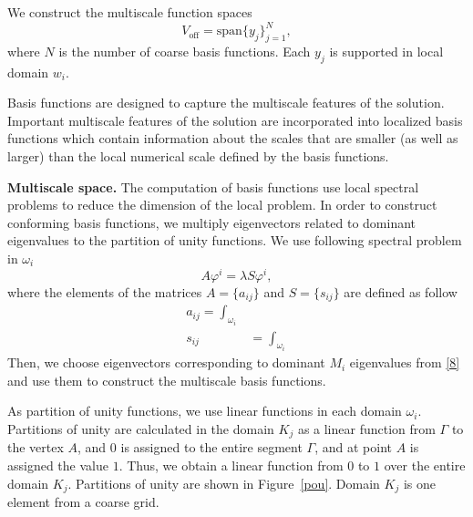 \documentclass[preprint]{elsarticle}
\begin{document}
We construct the multiscale function spaces
\[
	{V}_{\text{off}} = \mbox{span} \{y_{j}\}_{j=1}^{N},
\]
where $N$ is the number of coarse basis functions.
Each $y_j$ is supported in local domain $w_i$.

Basis functions are designed to capture the multiscale features of the solution. 
Important multiscale features of the solution are incorporated into localized basis functions which contain information about the scales that are smaller (as well as larger) than the local numerical scale defined by the basis functions. 
 
\textbf{Multiscale space.}
The computation of basis functions use local spectral problems to reduce the dimension of the local problem. 
In order to construct conforming basis functions, we multiply eigenvectors related to dominant eigenvalues to the partition of unity functions.
We use following spectral problem in $\omega_i$
\begin{equation}\label{8}
	A \varphi^i = \lambda S \varphi^i,
\end{equation} 
where the elements of the matrices $A = \{a_{ij}\}$ and $S = \{s_{ij}\}$ are defined as follow{
\begin{equation}\label{9}
\begin{split}
	a_{ij} = 
	\int_{\omega_i} \\
	s_{ij} & = \int_{\omega _i}
\end{split}
\end{equation}}
Then, we choose eigenvectors corresponding to dominant $M_{i}$ eigenvalues from \eqref{8} and use them to construct the multiscale basis functions.

As partition of unity functions, we use linear functions in each domain $\omega_i$.
Partitions of unity are calculated in the domain $K_j$ as a linear function from $\Gamma$ to the vertex $A$, and $0$ is assigned to the entire segment $\Gamma$, and at point $A$ is assigned the value $1$. 
Thus, we obtain a linear function from $0$ to $1$ over the entire domain $K_j$. 
Partitions of unity are shown in Figure~\ref{pou}. 
Domain $K_j$ is one element from a coarse grid. 
\end{document}
